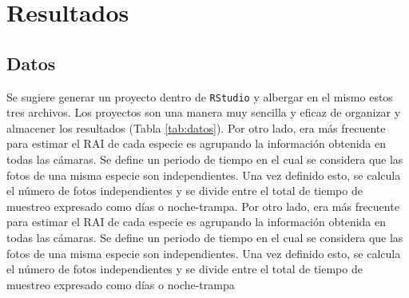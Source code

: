 \documentclass[
  10.5pt,
  a5paper]{book}
\begin{document}
\chapter{Resultados}\label{resultados}

\section{Datos}\label{datos}

Se sugiere generar un proyecto dentro de \texttt{RStudio} y albergar en el mismo estos tres archivos. Los proyectos son una manera muy sencilla y eficaz de organizar y almacener los resultados (Tabla \ref{tab:datos}). Por otro lado, era más frecuente para estimar el RAI de cada especie es agrupando la información obtenida en todas las cámaras. Se define un periodo de tiempo en el cual se considera que las fotos de una misma especie son independientes. Una vez definido esto, se calcula el número de fotos independientes y se divide entre el total de tiempo de muestreo expresado como días o noche-trampa. Por otro lado, era más frecuente para estimar el RAI de cada especie es agrupando la información obtenida en todas las cámaras. Se define un periodo de tiempo en el cual se considera que las fotos de una misma especie son independientes. Una vez definido esto, se calcula el número de fotos independientes y se divide entre el total de tiempo de muestreo expresado como días o noche-trampa
\end{document}
